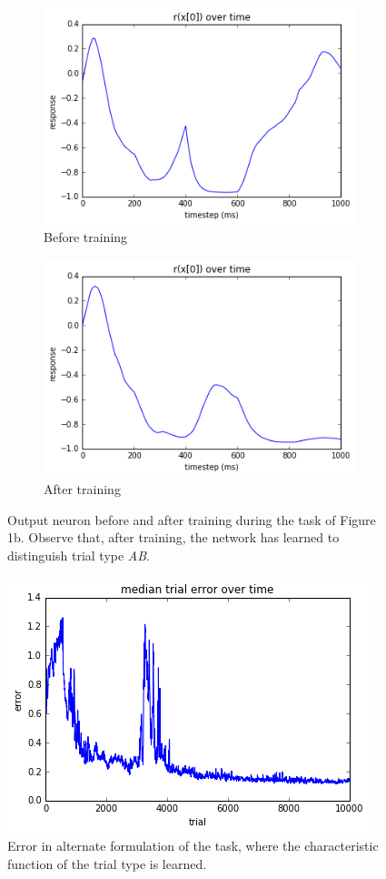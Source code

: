 \documentclass{article}
\theoremstyle{plain}
\theoremstyle{definition}
\theoremstyle{remark}
\begin{document}
\begin{figure}
\begin{subfigure}{.5\textwidth}
  \centering
  \includegraphics[width=.8\linewidth]{before}
  \caption{Before training}
  \label{fig:sfig1}
\end{subfigure}%
\begin{subfigure}{.5\textwidth}
  \centering
  \includegraphics[width=.8\linewidth]{after}
  \caption{After training}
  \label{fig:sfig2}
\end{subfigure}
\caption{Output neuron before and after training during the task of Figure 1b. Observe that, after training, the network has learned to distinguish trial type \textit{AB}.}
\label{fig:fig}
\end{figure}

\begin{figure}
\centering
\includegraphics[width=.8\linewidth]{error4}
\caption{Error in alternate formulation of the task, where the characteristic function of the trial type is learned.}
\label{fig:fig}
\end{figure}
\end{document}
